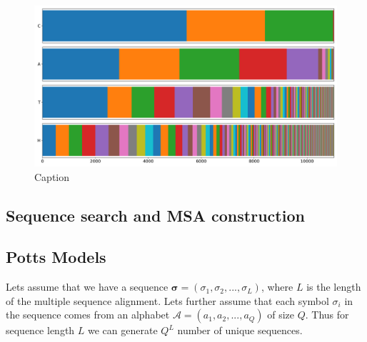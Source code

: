 \begin{figure}
    \centering
    \includegraphics[scale=0.4]{imgs_tomas/cath_distributions_filtered.png}
    \caption{Caption}
    \label{fig:cath_filtered}
\end{figure}

\subsection{Sequence search and MSA construction}



\subsection{Potts Models}

Lets assume that we have a sequence $\boldsymbol{\sigma} = (\sigma_1, \sigma_2, ..., \sigma_L)$, where $L$ is the length of the multiple sequence alignment. 
Lets further assume that each symbol $\sigma_i$ in the sequence comes from an alphabet $\mathcal{A} = (a_1, a_2, ..., a_Q)$ of size $Q$. 
Thus for sequence length $L$ we can generate $Q^L$ number of unique sequences.
    

